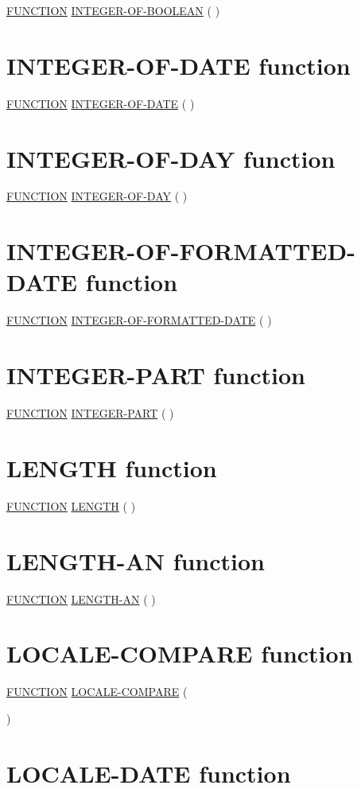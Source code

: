 \documentclass[a4paper,oneside,svgnames]{scrbook}
\makeatletter
\newcommand{\key}[1]{\underline{#1}}
\newcommand{\miscext}[1]{%
  \colorbox{blue!50}{#1}}
\newcommand{\pending}[1]{%
  \textcolor{gray!75}{#1}}
\newenvironment{0-1}{$\left[ \begin{tabular}{@{}l@{}}}{\end{tabular} \right]$}
\makeatother
\begin{document}
\pending{
  \key{FUNCTION} \key{INTEGER-OF-BOOLEAN} ( \argument )
}

\section{INTEGER-OF-DATE function}

\key{FUNCTION} \key{INTEGER-OF-DATE} ( \argument )

\section{INTEGER-OF-DAY function}

\key{FUNCTION} \key{INTEGER-OF-DAY} ( \argument )

\section{INTEGER-OF-FORMATTED-DATE function}

\key{FUNCTION} \key{INTEGER-OF-FORMATTED-DATE} ( \argument \argument )

\section{INTEGER-PART function}

\key{FUNCTION} \key{INTEGER-PART} ( \argument )

\section{LENGTH function}

\key{FUNCTION} \key{LENGTH} ( \argument )

\section{LENGTH-AN function}

\miscext{
  \key{FUNCTION} \key{LENGTH-AN} ( \argument )
}

\section{LOCALE-COMPARE function}

\key{FUNCTION} \key{LOCALE-COMPARE} ( \argument \argument
\begin{0-1}
  \argument
\end{0-1}
)

\section{LOCALE-DATE function}
\end{document}
